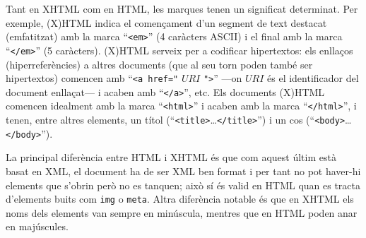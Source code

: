Tant en XHTML com en HTML, les marques tenen un significat determinat.
Per exemple, (X)HTML indica el començament d'un segment de text
destacat (emfatitzat) amb la marca ``{\tt <em>}'' (4 caràcters ASCII)
i el final amb la marca ``{\tt </em>}'' (5 caràcters). (X)HTML serveix
per a codificar hipertextos: els enllaços (hiperreferències) a altres
documents (que al seu torn poden també ser hipertextos) comencen amb
``\texttt{<a href="} $\mathit{URI}$ \texttt{"}\texttt{>}'' ---on
$\mathit{URI}$ és el identificador del document enllaçat--- i acaben
amb ``\texttt{</a>}'', etc. Els documents (X)HTML comencen idealment
amb la marca ``\texttt{<html>}'' i acaben amb la marca
``\texttt{</html>}'', i tenen, entre altres elements, un títol
(``\texttt{<title>}\ldots\texttt{</title>}'') i un cos
(``\texttt{<body>}\ldots\texttt{</body>}'').  

La principal diferència entre HTML i XHTML és que com aquest últim
està basat en XML, el document ha de ser XML ben format i per tant no
pot haver-hi elements que s'obrin però no es tanquen; això sí és valid
en HTML quan es tracta d'elements buits com \texttt{img} o
\texttt{meta}. Altra diferència notable és que en XHTML els noms dels
elements van sempre en minúscula, mentres que en HTML poden anar en
majúscules.


